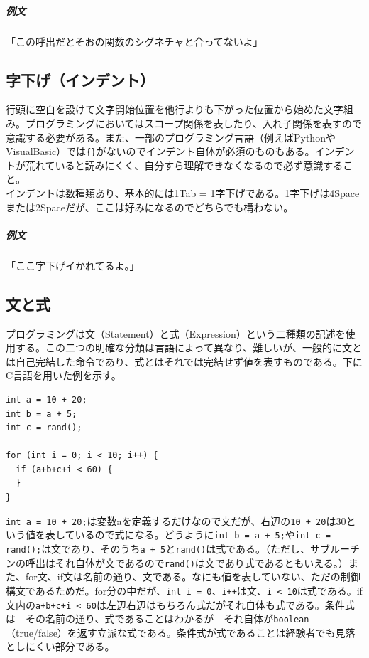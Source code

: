 \documentclass[dvipdfmx,jb5]{jreport}
\newcommand{\terlogy}[2][|]{\colorbox{terlogy}{\texttt{\lstinline#1#2#1}}}
\begin{document}
\subparagraph{例文} 「この呼出だとそおの関数のシグネチャと合ってないよ」

\subsection{字下げ（インデント）}
行頭に空白を設けて文字開始位置を他行よりも下がった位置から始めた文字組み。プログラミングにおいてはスコープ関係を表したり、入れ子関係を表すので意識する必要がある。また、一部のプログラミング言語（例えばPythonやVisualBasic）では\terlogy{{}}がないのでインデント自体が必須のものもある。インデントが荒れていると読みにくく、自分すら理解できなくなるので必ず意識すること。
\\

インデントは数種類あり、基本的には1Tab = 1字下げである。1字下げは4Spaceまたは2Spaceだが、ここは好みになるのでどちらでも構わない。

\subparagraph{例文}「ここ字下げイかれてるよ。」

\subsection{文と式}
プログラミングは文（Statement）と式（Expression）という二種類の記述を使用する。この二つの明確な分類は言語によって異なり、難しいが、一般的に文とは自己完結した命令であり、式とはそれでは完結せず値を表すものである。下にC言語を用いた例を示す。


\lstset{language=C}
\begin{lstlisting}
int a = 10 + 20;
int b = a + 5;
int c = rand();

for (int i = 0; i < 10; i++) {
  if (a+b+c+i < 60) {
  }
}
\end{lstlisting}

\terlogy{int a = 10 + 20;}は変数aを定義するだけなので文だが、右辺の\terlogy{10 + 20}は30という値を表しているので式になる。どうように\terlogy{int b = a + 5;}や\terlogy{int c = rand();}は文であり、そのうち\terlogy{a + 5}と\terlogy{rand()}は式である。（ただし、サブルーチンの呼出はそれ自体が文であるので\terlogy{rand()}は文であり式であるともいえる。）また、for文、if文は名前の通り、文である。なにも値を表していない、ただの制御構文であるためだ。for分の中だが、\terlogy{int i = 0}、\terlogy{i++}は文、\terlogy{i < 10}は式である。if文内の\terlogy{a+b+c+i < 60}は左辺右辺はもちろん式だがそれ自体も式である。条件式は---その名前の通り、式であることはわかるが---それ自体が\terlogy{boolean}（true/false）を返す立派な式である。条件式が式であることは経験者でも見落としにくい部分である。
\\
\end{document}
